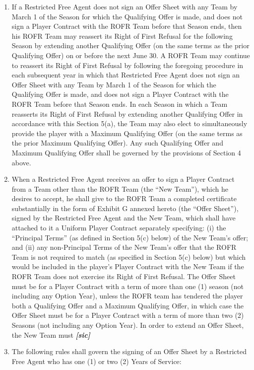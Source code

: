\documentclass[
]{book}
\begin{document}
\begin{enumerate}
\def\labelenumi{(\alph{enumi})}
\item
  If a Restricted Free Agent does not sign an Offer Sheet with any Team by March 1 of the Season for which the Qualifying Offer is made, and does not sign a Player Contract with the ROFR Team before that Season ends, then his ROFR Team may reassert its Right of First Refusal for the following Season by extending another Qualifying Offer (on the same terms as the prior Qualifying Offer) on or before the next June 30. A ROFR Team may continue to reassert its Right of First Refusal by following the foregoing procedure in each subsequent year in which that Restricted Free Agent does not sign an Offer Sheet with any Team by March 1 of the Season for which the Qualifying Offer is made, and does not sign a Player Contract with the ROFR Team before that Season ends. In each Season in which a Team reasserts its Right of First Refusal by extending another Qualifying Offer in accordance with this Section 5(a), the Team may also elect to simultaneously provide the player with a Maximum Qualifying Offer (on the same terms as the prior Maximum Qualifying Offer). Any such Qualifying Offer and Maximum Qualifying Offer shall be governed by the provisions of Section 4 above.
\item
  When a Restricted Free Agent receives an offer to sign a Player Contract from a Team other than the ROFR Team (the ``New Team''), which he desires to accept, he shall give to the ROFR Team a completed certificate substantially in the form of Exhibit G annexed hereto (the ``Offer Sheet''), signed by the Restricted Free Agent and the New Team, which shall have attached to it a Uniform Player Contract separately specifying: (i) the ``Principal Terms'' (as defined in Section 5(c) below) of the New Team's offer; and (ii) any non-Principal Terms of the New Team's offer that the ROFR Team is not required to match (as specified in Section 5(c) below) but which would be included in the player's Player Contract with the New Team if the ROFR Team does not exercise its Right of First Refusal. The Offer Sheet must be for a Player Contract with a term of more than one (1) season (not including any Option Year), unless the ROFR team has tendered the player both a Qualifying Offer and a Maximum Qualifying Offer, in which case the Offer Sheet must be for a Player Contract with a term of more than two (2) Seasons (not including any Option Year). In order to extend an Offer Sheet, the New Team must \textbf{\emph{{[}sic{]}}}
\item
  The following rules shall govern the signing of an Offer Sheet by a Restricted Free Agent who has one (1) or two (2) Years of Service:


\end{enumerate}
\end{document}
